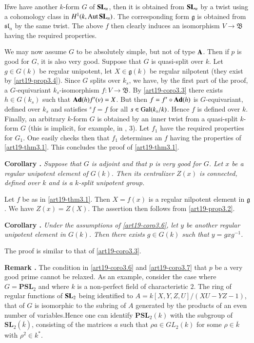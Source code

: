 If\pageoriginale we have another $k$-form $G$ of $\mathbf{S}\mathbf{L}_{n}$, then it is obtained from $\mathbf{S}\mathbf{L}_{n}$ by a twist using a cohomology class in $H^{1}(k,\operatorname{\mathrm{Aut}} \mathbf{S}\mathbf{L}_{n})$. The corresponding form $\mathfrak{g}$ is obtained from $\mathfrak{s}\mathfrak{l}_{n}$ by the same twist. The above $f$ then clearly induces an isomorphism $V\to \mathfrak{B}$ having the required properties.

We may now assume $G$ to be absolutely simple, but not of type $\mathbf{A}$. Then if $p$ is good for $G$, it is also very good. Suppose that $G$ is quasi-split over $k$. Let $g\in G(k)$ be regular unipotent, let $X\in \mathfrak{g}(k)$ be regular nilpotent (they exist by \ref{art19-prop3.4}). Since $G$ splits over $k_{s}$, we have, by the first part of the proof, a $G$-equivariant $k_{s}$-isomorphism $f:V\to \mathfrak{B}$. By \ref{art19-coro3.3} there exists $h\in G(k_{s})$ such that $\mathbf{Ad}(h)f'(v)=X$. But then $f=f'\circ \mathbf{Ad}(h)$ is $G$-equivariant, defined over $k_{s}$ and satisfies ${}^{s}f=f$ for all $s\in \operatorname{\mathrm{Gal}}(k_{s}/k)$. Hence $f$ is defined over $k$. Finally, an arbitrary $k$-form $G$ is obtained by an inner twist from a quasi-split $k$-form $G$ (this is implicit, for example, in \cite{art19-key18}, 3). Let $f_{1}$ have the required properties for $G_{1}$. One easily checks then that $f_{1}$ determines an $f$ having the properties of \ref{art19-thm3.1}. This concludes the proof of \ref{art19-thm3.1}.

\medskip
\noindent
{\bf Corollary .\label{art19-coro3.6}}
{\em Suppose that $G$ is adjoint and that $p$ is very good for $G$. Let $x$ be a regular unipotent element of $G(k)$. Then its centralizer $Z(x)$ is connected, defined over $k$ and is a $k$-split unipotent group.}
\smallskip

Let $f$ be as in \ref{art19-thm3.1}. Then $X=f(x)$ is a regular nilpotent element in $\mathfrak{g}$. We have $Z(x)=Z(X)$. The assertion then follows from \ref{art19-prop3.2}.

\medskip
\noindent
{\bf Corollary .\label{art19-coro3.7}}
{\em Under the assumptions of \ref{art19-coro3.6}, let $y$ be another regular unipotent element in $G(k)$. Then there exists $g\in G(k)$ such that $y=gxg^{-1}$.}
\smallskip

The proof is similar to that of \ref{art19-coro3.3}.

\medskip
\noindent
{\bf Remark .\label{art19-rem3.8}}
The condition in \ref{art19-coro3.6} and \ref{art19-coro3.7} that $p$ be a very good prime cannot be relaxed. As an example, consider the case where $G=\mathbf{PSL}_{2}$ and where $k$ is a non-perfect field of characteristic $2$. The ring of regular functions of $\mathbf{S}\mathbf{L}_{2}$ being identified to $A=k[X,Y,Z,U]/(XU-YZ-1)$, that of $G$ is isomorphic to the subring of $A$ generated by the products of an even number of variables.\pageoriginale Hence one can identify $\mathbf{PSL}_{2}(k)$ with the subgroup of $\mathbf{SL}_{2}(\overline{k})$, consisting of the matrices $a$ such that $\rho a\in GL_{2}(k)$ for some $\rho\in \overline{k}$ with $\rho^{2}\in k^{*}$.
\smallskip

